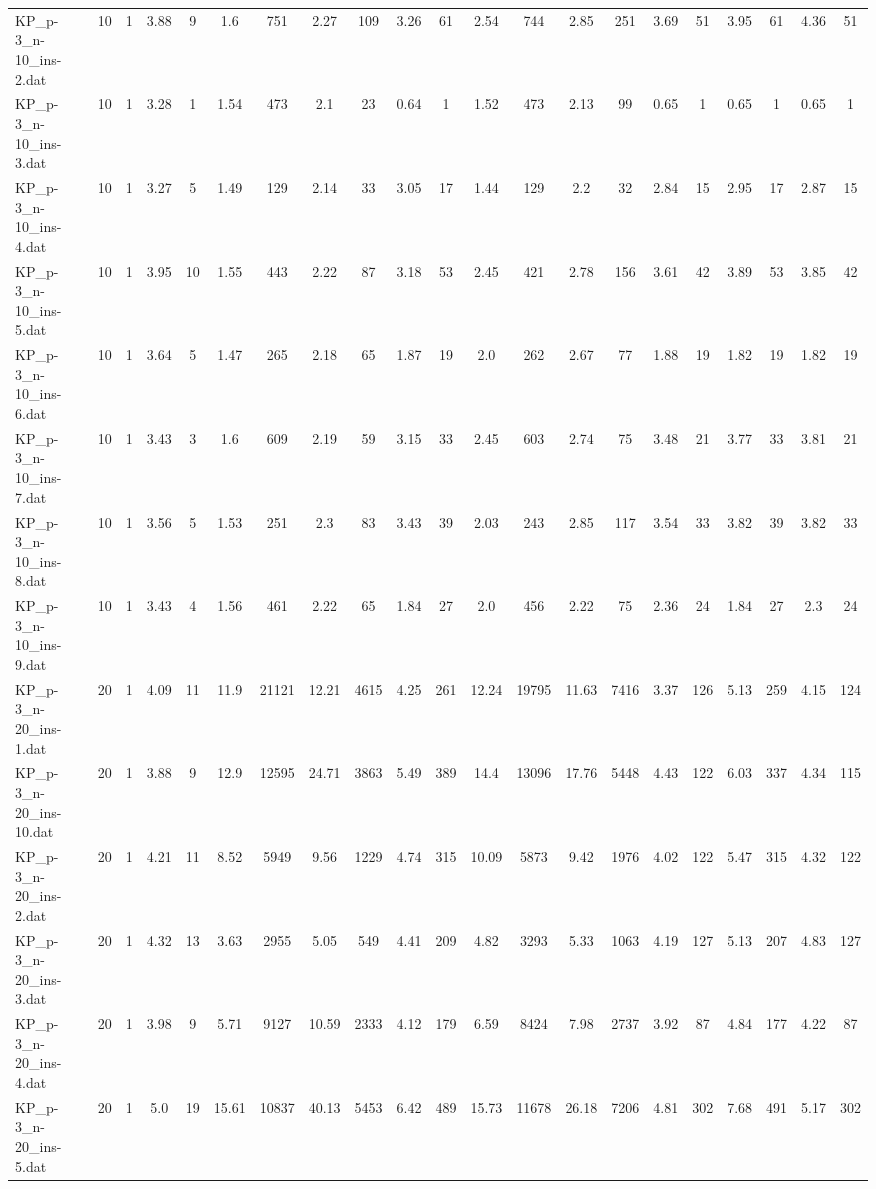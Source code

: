 \begin{sidewaystable}[!ht]
{\begin{tabular}{lcccccccccccccccccccc}
KP\_p-3\_n-10\_ins-2.dat & 10 & 1 & 3.88 & 9 & 1.6 & 751 & 2.27 & 109 & 3.26 & 61 & 2.54 & 744 & 2.85 & 251 & 3.69 & 51 & 3.95 & 61 & 4.36 & 51 \\
KP\_p-3\_n-10\_ins-3.dat & 10 & 1 & 3.28 & 1 & 1.54 & 473 & 2.1 & 23 & 0.64 & 1 & 1.52 & 473 & 2.13 & 99 & 0.65 & 1 & 0.65 & 1 & 0.65 & 1 \\
KP\_p-3\_n-10\_ins-4.dat & 10 & 1 & 3.27 & 5 & 1.49 & 129 & 2.14 & 33 & 3.05 & 17 & 1.44 & 129 & 2.2 & 32 & 2.84 & 15 & 2.95 & 17 & 2.87 & 15 \\
KP\_p-3\_n-10\_ins-5.dat & 10 & 1 & 3.95 & 10 & 1.55 & 443 & 2.22 & 87 & 3.18 & 53 & 2.45 & 421 & 2.78 & 156 & 3.61 & 42 & 3.89 & 53 & 3.85 & 42 \\
KP\_p-3\_n-10\_ins-6.dat & 10 & 1 & 3.64 & 5 & 1.47 & 265 & 2.18 & 65 & 1.87 & 19 & 2.0 & 262 & 2.67 & 77 & 1.88 & 19 & 1.82 & 19 & 1.82 & 19 \\
KP\_p-3\_n-10\_ins-7.dat & 10 & 1 & 3.43 & 3 & 1.6 & 609 & 2.19 & 59 & 3.15 & 33 & 2.45 & 603 & 2.74 & 75 & 3.48 & 21 & 3.77 & 33 & 3.81 & 21 \\
KP\_p-3\_n-10\_ins-8.dat & 10 & 1 & 3.56 & 5 & 1.53 & 251 & 2.3 & 83 & 3.43 & 39 & 2.03 & 243 & 2.85 & 117 & 3.54 & 33 & 3.82 & 39 & 3.82 & 33 \\
KP\_p-3\_n-10\_ins-9.dat & 10 & 1 & 3.43 & 4 & 1.56 & 461 & 2.22 & 65 & 1.84 & 27 & 2.0 & 456 & 2.22 & 75 & 2.36 & 24 & 1.84 & 27 & 2.3 & 24 \\
KP\_p-3\_n-20\_ins-1.dat & 20 & 1 & 4.09 & 11 & 11.9 & 21121 & 12.21 & 4615 & 4.25 & 261 & 12.24 & 19795 & 11.63 & 7416 & 3.37 & 126 & 5.13 & 259 & 4.15 & 124 \\
KP\_p-3\_n-20\_ins-10.dat & 20 & 1 & 3.88 & 9 & 12.9 & 12595 & 24.71 & 3863 & 5.49 & 389 & 14.4 & 13096 & 17.76 & 5448 & 4.43 & 122 & 6.03 & 337 & 4.34 & 115 \\
KP\_p-3\_n-20\_ins-2.dat & 20 & 1 & 4.21 & 11 & 8.52 & 5949 & 9.56 & 1229 & 4.74 & 315 & 10.09 & 5873 & 9.42 & 1976 & 4.02 & 122 & 5.47 & 315 & 4.32 & 122 \\
KP\_p-3\_n-20\_ins-3.dat & 20 & 1 & 4.32 & 13 & 3.63 & 2955 & 5.05 & 549 & 4.41 & 209 & 4.82 & 3293 & 5.33 & 1063 & 4.19 & 127 & 5.13 & 207 & 4.83 & 127 \\
KP\_p-3\_n-20\_ins-4.dat & 20 & 1 & 3.98 & 9 & 5.71 & 9127 & 10.59 & 2333 & 4.12 & 179 & 6.59 & 8424 & 7.98 & 2737 & 3.92 & 87 & 4.84 & 177 & 4.22 & 87 \\
KP\_p-3\_n-20\_ins-5.dat & 20 & 1 & 5.0 & 19 & 15.61 & 10837 & 40.13 & 5453 & 6.42 & 489 & 15.73 & 11678 & 26.18 & 7206 & 4.81 & 302 & 7.68 & 491 & 5.17 & 302 \\

\end{tabular}}
\end{sidewaystable}
